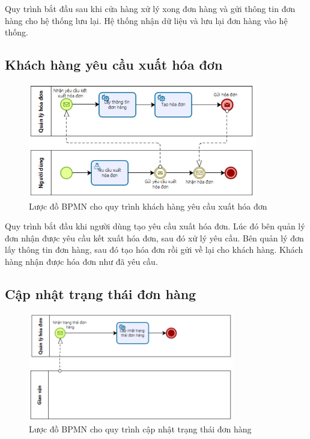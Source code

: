 Quy trình bắt đầu sau khi cửa hàng xử lý xong đơn hàng và gửi thông tin đơn hàng cho hệ thống lưu lại. Hệ thống nhận dữ liệu và lưu lại đơn hàng vào hệ thống.

\newpage

\subsection{Khách hàng yêu cầu xuất hóa đơn}
\begin{figure}[!htp]
	\centering
	\includegraphics[width=10cm]{img/BPMN/Tho/invoice_log.PNG}
	\newline
	\caption{Lược đồ BPMN cho quy trình khách hàng yêu cầu xuất hóa đơn}
\end{figure}

Quy trình bắt đầu khi người dùng tạo yêu cầu xuất hóa đơn. Lúc đó bên quản lý đơn nhận được yêu cầu kết xuất hóa đơn, sau đó xử lý yêu cầu. Bên quản lý đơn lấy thông tin đơn hàng, sau đó tạo hóa đơn rồi gửi về lại cho khách hàng. Khách hàng nhận được hóa đơn như đã yêu cầu.

\subsection{Cập nhật trạng thái đơn hàng}
\begin{figure}[!htp]
	\centering
	\includegraphics[width=9cm]{img/BPMN/Tho/update_status.PNG}
	\newline
	\caption{Lược đồ BPMN cho quy trình cập nhật trạng thái đơn hàng}
\end{figure}

